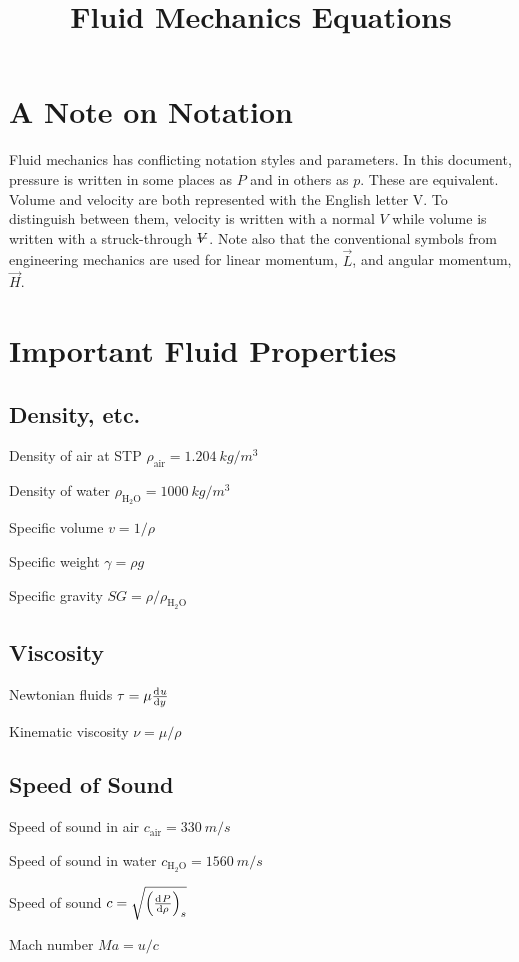 \documentclass{article}
\title{Fluid Mechanics Equations}
\begin{document}


\section*{A Note on Notation}

Fluid mechanics has conflicting notation styles and parameters.  In this document, pressure is
written in some places as $P$ and in others as $p$. These are equivalent.  Volume and velocity are
both represented with the English letter V.  To distinguish between them, velocity is written with a
normal $V$ while volume is written with a struck-through $\volsym$.  Note also that the conventional
symbols from engineering mechanics are used for linear momentum, $\vec{L}$, and angular momentum,
$\vec{H}$.

\section{Important Fluid Properties}

\subsection{Density, etc.}
\begin{description*}
\item[Density of air at STP]
  \(\rho_\mathrm{air} = \SI{1.204}{kg/m^3}\)
\item[Density of water]
  \(\rho_\mathrm{H_2O} = \SI{1000}{kg/m^3}\)
\item[Specific volume]
  \(v = 1/\rho\)
\item[Specific weight]
  \(\gamma = \rho g\)
\item[Specific gravity]
  \(\mathit{SG} = \rho / \rho_\mathrm{H_2O}\)
\end{description*}

\subsection{Viscosity}
\begin{description*}
\item[Newtonian fluids]
  \(\tau = \mu \od{u}{y}\)
\item[Kinematic viscosity]
  \(\nu = \mu / \rho\)
\end{description*}

\subsection{Speed of Sound}
\begin{description*}
\item[Speed of sound in air]
  \(c_\mathrm{air} = \SI{330}{m/s}\)
\item[Speed of sound in water]
  \(c_\mathrm{H_2O} = \SI{1560}{m/s}\)
\item[Speed of sound]
  \(c = \sqrt{\left(\od{P}{\rho}\right)_s}\)
\item[Mach number]
  \(\mathit{Ma} = u/c\)
\end{description*}
\end{document}
